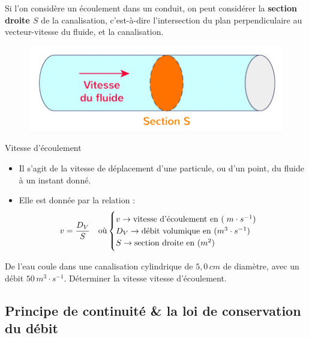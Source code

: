 \documentclass[11pt,a4paper]{article}
\begin{document}
Si l'on considère un écoulement dans un conduit, on peut considérer la \textbf{section droite $S$} de la canalisation, c'est-à-dire l'intersection du plan perpendiculaire au vecteur-vitesse du fluide, et la canalisation. 

\begin{figure}[H]
    \centering
    \includegraphics[width=0.7\linewidth]{imgs/p9/sectionTube.jpg}
    \caption{}
\end{figure}

\begin{defn}{Vitesse d'écoulement}
\begin{itemize}
    \item Il s'agit de la vitesse de déplacement d'une particule, ou d'un point, du fluide à un instant donné. 
    \item Elle est donnée par la relation : 
    \[v = \dfrac{D_V}{S}
    \quad \text{où} \begin{cases}
    v \rightarrow \text{vitesse d'écoulement en }(\; m\cdot s^{-1}) \\
    D_V \rightarrow \text{débit volumique en }(m^3\cdot s^{-1}) \\
    S \rightarrow \text{section droite en }(m^2) 
    \end{cases}
    \]
\end{itemize}
\end{defn}

\begin{exo}
De l'eau coule dans une canalisation cylindrique de $5,0\,cm$ de diamètre, avec un débit $50\,m^3\cdot s^{-1}$. Déterminer la vitesse vitesse d'écoulement. 
\vspace{5cm}
\end{exo}


\subsection{Principe de continuité \& la loi de conservation du débit}
\end{document}
